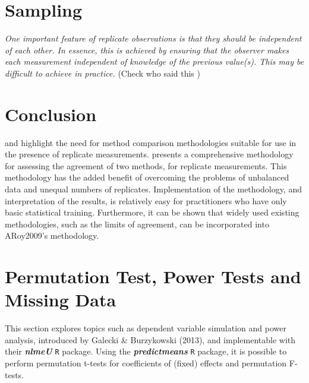 \documentclass[12pt, a4paper]{report}
\theoremstyle{plain}
\theoremstyle{definition}
\theoremstyle{remark}
\begin{document}
	
	
	
	
	

	\section{Sampling}
	\emph{
		One important feature of replicate observations is that they should be independent
		of each other. In essence, this is achieved by ensuring that the observer makes each
		measurement independent of knowledge of the previous value(s). This may be difficult
		to achieve in practice.} (Check who said this
	)
	
	
	
	
	
	
	
	\section{Conclusion}
	\citet{BXC2008} and \citet{AARoy20092009} highlight the need for method comparison methodologies suitable for use in the presence of replicate measurements. \citet{AARoy20092009} presents a comprehensive methodology for assessing the agreement of two methods, for replicate measurements. This methodology has the added benefit of overcoming the problems of unbalanced data and unequal numbers of replicates. Implementation of the methodology, and interpretation of the results, is relatively easy for practitioners who have only basic statistical training. Furthermore, it can be shown that widely used existing methodologies, such as the limits of agreement, can be incorporated into ARoy2009's methodology.
	
	\section*{Permutation Test, Power Tests and Missing Data }
	
	This section explores topics such as dependent variable simulation and power analysis, introduced by Galecki \& Burzykowski (2013), and implementable with their \textbf{\textit{nlmeU}} \texttt{R} package.
	Using the \textbf{\textit{predictmeans}} \texttt{R} package, it is possible to perform permutation t-tests for coefficients of (fixed) effects and permutation F-tests.
	
\end{document}
